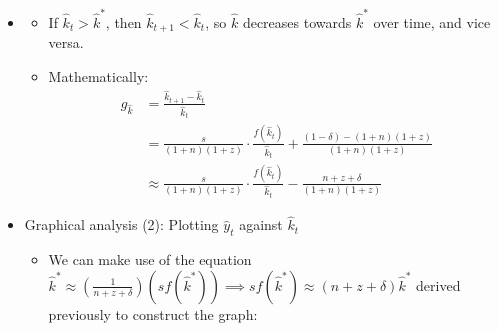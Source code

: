 \documentclass[notitlepage]{article}
\begin{document}
\begin{figure}[h]
    \centering
    \resizebox{0.8\textwidth}{!}{
    
    }
\end{figure}
\newpage
\begin{itemize} \item[]
\begin{itemize}
\item If $\hat{k}_t > \hat{k}^*$, then $\hat{k}_{t+1} < \hat{k}_t$, so $\hat{k}$ decreases towards $\hat{k}^*$ over time, and vice versa.
\item Mathematically:
\begin{align*}
g_{\hat{k}} &= \frac{\hat{k}_{t+1}-\hat{k}_t}{\hat{k}_t} \\
&= \frac{s}{(1+n)(1+z)}\cdot\frac{f(\hat{k}_t)}{\hat{k}_t} + \frac{(1-\delta)-(1+n)(1+z)}{(1+n)(1+z)} \\
&\approx \frac{s}{(1+n)(1+z)}\cdot\frac{f(\hat{k}_t)}{\hat{k}_t} - \frac{n+z+\delta}{(1+n)(1+z)}
\end{align*}
\end{itemize}
\item Graphical analysis (2): Plotting $\hat{y}_{t}$ against $\hat{k}_{t}$
\begin{itemize}
\item We can make use of the equation $\hat{k}^* \approx \left(\frac{1}{n+z+\delta}\right)\left(sf(\hat{k}^*)\right) \implies sf(\hat{k}^*) \approx (n+z+\delta)\hat{k}^*$ derived previously to construct the graph:
\end{itemize}
\end{itemize}
\begin{figure}[h]
    \centering
    \resizebox{0.8\textwidth}{!}{
    
    }
\end{figure}
\end{document}
